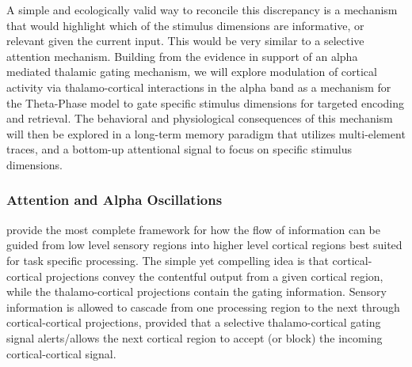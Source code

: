 \documentclass[11pt, titlepage, twoside]{article}
\begin{document}

A simple and ecologically valid way to reconcile this discrepancy is a mechanism that would highlight which of the stimulus dimensions are informative, or relevant given the current input.  This would be very similar to a selective attention mechanism.  Building from the evidence in support of an alpha mediated thalamic gating mechanism, we will explore modulation of cortical activity via thalamo-cortical interactions in the alpha band as a mechanism for the Theta-Phase model to gate specific stimulus dimensions for targeted encoding and retrieval.  The behavioral and physiological consequences of this mechanism will then be explored in a long-term memory paradigm that utilizes multi-element traces, and a bottom-up attentional signal to focus on specific stimulus dimensions.


\subsubsection{Attention and Alpha Oscillations}
\textcite{ShermanGuillery06} provide the most complete framework for how the flow of information can be guided from low level sensory regions into higher level cortical regions best suited for task specific processing.  The simple yet compelling idea is that cortical-cortical projections convey the contentful output from a given cortical region, while the thalamo-cortical projections contain the gating information.  Sensory information is allowed to cascade from one processing region to the next through cortical-cortical projections, provided that a selective thalamo-cortical gating signal alerts/allows the next cortical region to accept (or block) the incoming cortical-cortical signal.  
\end{document}
